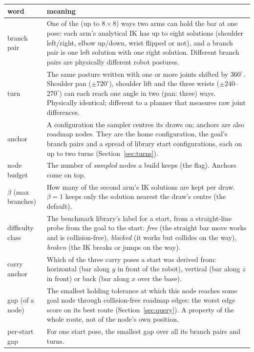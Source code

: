 \documentclass[11pt,a4paper]{article}
\newcommand{\code}[1]{\texttt{\detokenize{#1}}}
\begin{document}
\begin{center}
\footnotesize
\begin{tabular}{@{}>{\raggedright\arraybackslash}p{2.9cm} >{\raggedright\arraybackslash}p{13.0cm}@{}}
\toprule
word & meaning \\
\midrule
branch pair & One of the (up to $8 \times 8$) ways two arms can hold the bar at one pose: each arm's analytical IK has up to eight solutions (shoulder left/right, elbow up/down, wrist flipped or not), and a branch pair is one left solution with one right solution. Different branch pairs are physically different robot postures. \\
turn & The same posture written with one or more joints shifted by $360^\circ$. Shoulder pan ($\pm 720^\circ$), shoulder lift and the three wrists ($\pm 240$--$270^\circ$) can each reach one angle in two (pan: three) ways. Physically identical; different to a planner that measures raw joint differences. \\
anchor & A configuration the sampler centres its draws on; anchors are also roadmap nodes. They are the home configuration, the goal's branch pairs and a spread of library start configurations, each on up to two turns (Section~\ref{sec:turns}). \\
node budget & The number of \emph{sampled} nodes a build keeps (the \code{--nodes} flag). Anchors come on top. \\
$\beta$ (max branches) & How many of the second arm's IK solutions are kept per draw. $\beta = 1$ keeps only the solution nearest the draw's centre (the default). \\
difficulty class & The benchmark library's label for a start, from a straight-line probe from the goal to the start: \emph{free} (the straight bar move works and is collision-free), \emph{blocked} (it works but collides on the way), \emph{broken} (the IK breaks or jumps on the way). \\
carry anchor & Which of the three carry poses a start was derived from: horizontal (bar along $y$ in front of the robot), vertical (bar along $z$ in front) or back (bar along $x$ over the base). \\
gap (of a node) & The smallest holding tolerance at which this node reaches some goal node through collision-free roadmap edges: the worst edge score on its best route (Section~\ref{sec:query}). A property of the whole route, not of the node's own position. \\
per-start gap & For one start pose, the smallest gap over all its branch pairs and turns. \\

\end{tabular}
\end{center}
\end{document}

